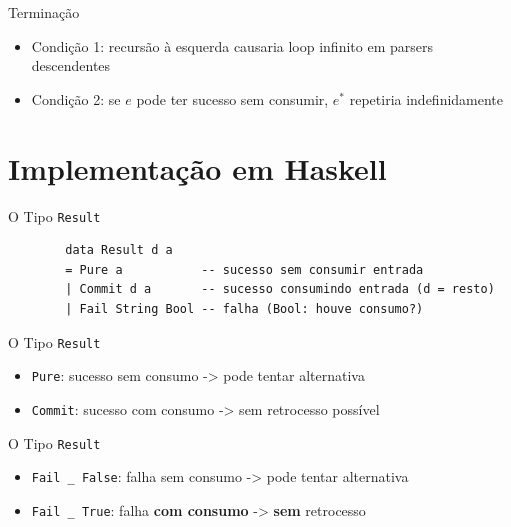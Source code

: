 \begin{frame}{Terminação}

    \begin{itemize}

        \item
        Condição 1: recursão à esquerda causaria loop infinito em parsers
        descendentes
        \item
        Condição 2: se \(e\) pode ter sucesso sem consumir, \(e^*\) repetiria
        indefinidamente
    \end{itemize}
\end{frame}


\section{Implementação em
Haskell}\label{implementauxe7uxe3o-em-haskell}

\begin{frame}[fragile]{O Tipo \texttt{Result}}

    \begin{lstlisting}
        data Result d a
        = Pure a           -- sucesso sem consumir entrada
        | Commit d a       -- sucesso consumindo entrada (d = resto)
        | Fail String Bool -- falha (Bool: houve consumo?)
    \end{lstlisting}
\end{frame}

\begin{frame}[fragile]{O Tipo \texttt{Result}}

    \begin{itemize}

        \item
        \texttt{Pure}: sucesso sem consumo -> pode tentar
        alternativa
        \item
        \texttt{Commit}: sucesso com consumo -> sem retrocesso
        possível
    \end{itemize}
\end{frame}

\begin{frame}[fragile]{O Tipo \texttt{Result}}

    \begin{itemize}

        \item
        \texttt{Fail \_ False}: falha sem consumo -> pode
        tentar alternativa
        \item
        \texttt{Fail \_ True}: falha \textbf{com consumo} ->
        \textbf{sem} retrocesso
    \end{itemize}
\end{frame}

